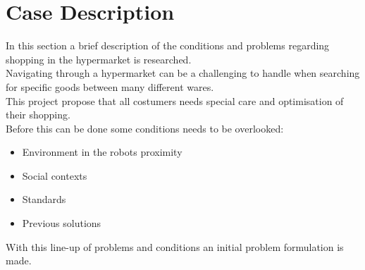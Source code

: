 \section{Case Description}\label{sec:CaseDesc}
In this section a brief description of the conditions and problems regarding shopping in the hypermarket is researched.\\
Navigating through a hypermarket can be a challenging to handle when searching for specific goods between many different wares.\\
This project propose that all costumers needs special care and optimisation of their shopping.\\
Before this can be done some conditions needs to be overlooked:
\begin{itemize}
    \item Environment in the robots proximity
    \item Social contexts
    \item Standards
    \item Previous solutions
\end{itemize}

With this line-up of problems and conditions an initial problem formulation is made.